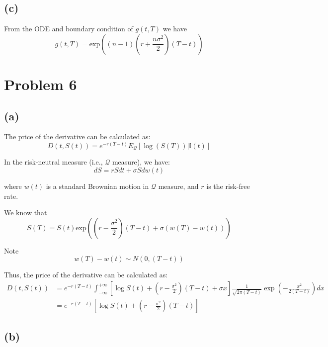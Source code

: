 \documentclass{article}
\begin{document}
\subsection{(c)}\label{c}

From the ODE and boundary condition of \(g(t,T)\) we have
\[g(t,T) = \text{exp} \left((n-1)\left( r + \frac{n\sigma^2}{2} \right) (T-t) \right)\]

\section{Problem 6}\label{problem-6}

\subsection{(a)}\label{a-1}

The price of the derivative can be calculated as:
\begin{equation}
  D(t, S(t)) = e^{-r(T-t)} E_{\mathcal{Q}} \left[ \log(S(T)) | \mathbb{I}(t) \right]
\end{equation}

In the risk-neutral measure (i.e., \(\mathcal{Q}\) measure), we have:
\begin{equation}
  dS = r S dt + \sigma S dw(t)
\end{equation}

where \(w(t)\) is a standard Brownian motion in \(\mathcal{Q}\) measure,
and \(r\) is the risk-free rate.

We know that
\begin{equation}
  S(T) = S(t) \text{exp} \left( \left( r - \frac{\sigma^2}{2} \right) (T-t) + \sigma (w(T) - w(t)) \right)
\end{equation}

Note \[ w(T) - w(t) \sim N(0, (T-t))\]

Thus, the price of the derivative can be calculated as: 
\begin{align}
D(t,S(t)) & = e^{-r(T-t)} \int_{-\infty}^{+\infty} \left[ \log S(t) + \left( r - \frac{\sigma^2}{2} \right) (T-t) + \sigma x \right] \frac{1}{\sqrt{2 \pi (T-t)}} \exp \left( - \frac{x^2}{2(T-t)}\right) dx \\
& = e^{-r(T-t)} \left[ \log S(t) + \left( r - \frac{\sigma^2}{2} \right) (T-t) \right]
\end{align}


\subsection{(b)}\label{b-1}
\end{document}
